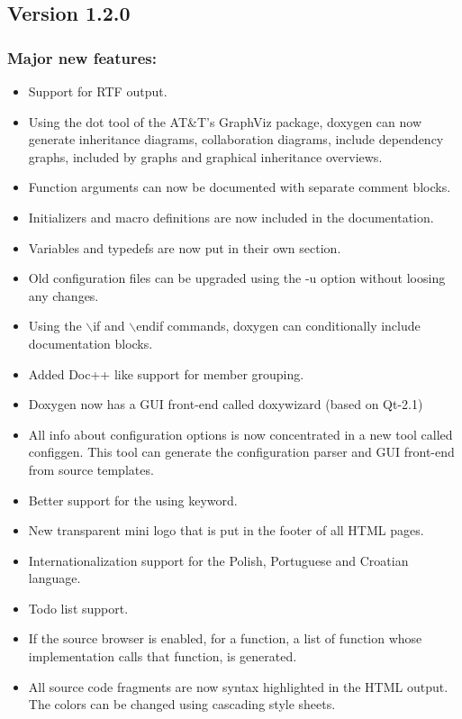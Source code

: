 \subsection*{Version 1.2.0}

\subsubsection*{Major new features:}

\begin{itemize}
\item Support for RTF output. \item Using the dot tool of the AT\&T's GraphViz package, doxygen can now generate inheritance diagrams, collaboration diagrams, include dependency graphs, included by graphs and graphical inheritance overviews. \item Function arguments can now be documented with separate comment blocks. \item Initializers and macro definitions are now included in the documentation. \item Variables and typedefs are now put in their own section. \item Old configuration files can be upgraded using the -u option without loosing any changes. \item Using the $\backslash$if and $\backslash$endif commands, doxygen can conditionally include documentation blocks. \item Added Doc++ like support for member grouping. \item Doxygen now has a GUI front-end called doxywizard (based on Qt-2.1) \item All info about configuration options is now concentrated in a new tool called configgen. This tool can generate the configuration parser and GUI front-end from source templates. \item Better support for the using keyword. \item New transparent mini logo that is put in the footer of all HTML pages. \item Internationalization support for the Polish, Portuguese and Croatian language. \item Todo list support. \item If the source browser is enabled, for a function, a list of function whose implementation calls that function, is generated. \item All source code fragments are now syntax highlighted in the HTML output. The colors can be changed using cascading style sheets. \end{itemize}


